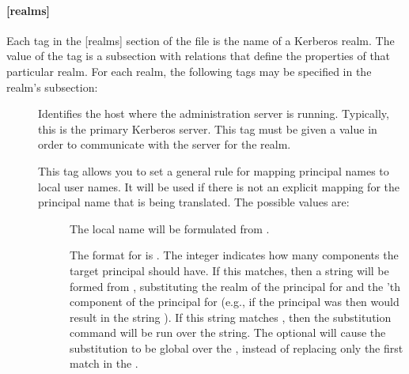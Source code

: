 \documentclass[letterpaper,10pt,english]{sphinxmanual}
\begin{document}
\paragraph{{[}realms{]}}
\label{\detokenize{admin/conf_files/krb5_conf:realms}}\label{\detokenize{admin/conf_files/krb5_conf:id2}}
\sphinxAtStartPar
Each tag in the {[}realms{]} section of the file is the name of a Kerberos
realm.  The value of the tag is a subsection with relations that
define the properties of that particular realm.  For each realm, the
following tags may be specified in the realm’s subsection:
\begin{description}
\item[{}] \leavevmode
\sphinxAtStartPar
Identifies the host where the administration server is running.
Typically, this is the primary Kerberos server.  This tag must be
given a value in order to communicate with the {\hyperref[\detokenize{admin/admin_commands/kadmind:kadmind-8}]{}}
server for the realm.

\item[{}] \leavevmode
\sphinxAtStartPar
This tag allows you to set a general rule for mapping principal
names to local user names.  It will be used if there is not an
explicit mapping for the principal name that is being
translated. The possible values are:
\begin{description}
\item[{}] \leavevmode
\sphinxAtStartPar
The local name will be formulated from .

\sphinxAtStartPar
The format for  is \sphinxstylestrong{{[}}\sphinxstylestrong{:}\sphinxstylestrong{{]}(}\sphinxstylestrong{/}.
The integer  indicates how many components the target
principal should have.  If this matches, then a string will be
formed from , substituting the realm of the principal
for  and the ’th component of the principal for
 (e.g., if the principal was  then
\sphinxcode{\sphinxupquote{{[}2:\$2\$1foo{]}}} would result in the string
).  If this string matches , then
the  substitution command will be run over the
string.  The optional  will cause the substitution to be
global over the , instead of replacing only the first
match in the .


\end{description}
\end{description}
\end{document}
